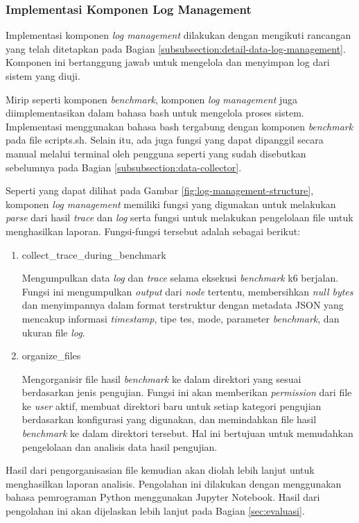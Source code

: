 \subsubsection{Implementasi Komponen Log Management}
\label{subsubsection:implementasi-log-management}

Implementasi komponen \textit{log management} dilakukan dengan mengikuti rancangan yang telah ditetapkan pada Bagian \ref{subsubsection:detail-data-log-management}. Komponen ini bertanggung jawab untuk mengelola dan menyimpan log dari sistem yang diuji.

Mirip seperti komponen \textit{benchmark}, komponen \textit{log management} juga diimplementasikan dalam bahasa bash untuk mengelola proses sistem. Implementasi menggunakan bahasa bash tergabung dengan komponen \textit{benchmark} pada file scripts.sh. Selain itu, ada juga fungsi yang dapat dipanggil secara manual melalui terminal oleh pengguna seperti yang sudah disebutkan sebelumnya pada Bagian \ref{subsubsection:data-collector}.

Seperti yang dapat dilihat pada Gambar \ref{fig:log-management-structure}, komponen \textit{log management} memiliki fungsi yang digunakan untuk melakukan \textit{parse} dari hasil \textit{trace} dan \textit{log} serta fungsi untuk melakukan pengelolaan file untuk menghasilkan laporan. Fungsi-fungsi tersebut adalah sebagai berikut:

\begin{enumerate}
  \item collect\_trace\_during\_benchmark
  
  Mengumpulkan data \textit{log} dan \textit{trace} selama eksekusi \textit{benchmark} k6 berjalan. Fungsi ini mengumpulkan \textit{output} dari \textit{node} tertentu, membersihkan \textit{null bytes} dan menyimpannya dalam format terstruktur dengan metadata JSON yang mencakup informasi \textit{timestamp}, tipe tes, mode, parameter \textit{benchmark}, dan ukuran file \textit{log}.

  \item organize\_files
  
  Mengorganisir file hasil \textit{benchmark} ke dalam direktori yang sesuai berdasarkan jenis pengujian. Fungsi ini akan memberikan \textit{permission} dari file ke \textit{user} aktif, membuat direktori baru untuk setiap kategori pengujian berdasarkan konfigurasi yang digunakan, dan memindahkan file hasil \textit{benchmark} ke dalam direktori tersebut. Hal ini bertujuan untuk memudahkan pengelolaan dan analisis data hasil pengujian.

\end{enumerate}

Hasil dari pengorganisasian file kemudian akan diolah lebih lanjut untuk menghasilkan laporan analisis. Pengolahan ini dilakukan dengan menggunakan bahasa pemrograman Python menggunakan Jupyter Notebook. Hasil dari pengolahan ini akan dijelaskan lebih lanjut pada Bagian \ref{sec:evaluasi}.